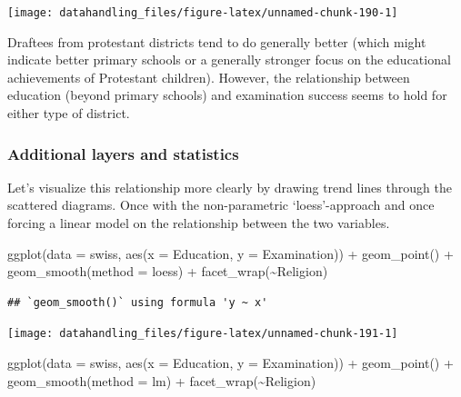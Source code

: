 \documentclass[
  12pt,
]{style/krantz}
\newenvironment{Shaded}{\begin{snugshade}}{\end{snugshade}}
\newcommand{\AttributeTok}[1]{\textcolor[rgb]{0.77,0.63,0.00}{#1}}
\newcommand{\FunctionTok}[1]{\textcolor[rgb]{0.00,0.00,0.00}{#1}}
\newcommand{\NormalTok}[1]{#1}
\newcommand{\SpecialCharTok}[1]{\textcolor[rgb]{0.00,0.00,0.00}{#1}}
\newcommand{\StringTok}[1]{\textcolor[rgb]{0.31,0.60,0.02}{#1}}
\begin{document}
\texttt{[image: datahandling\_files/figure-latex/unnamed-chunk-190-1]}

Draftees from protestant districts tend to do generally better (which might indicate better primary schools or a generally stronger focus on the educational achievements of Protestant children). However, the relationship between education (beyond primary schools) and examination success seems to hold for either type of district.

\hypertarget{additional-layers-and-statistics}{%
\subsubsection{Additional layers and statistics}\label{additional-layers-and-statistics}}

Let's visualize this relationship more clearly by drawing trend lines through the scattered diagrams. Once with the non-parametric `loess'-approach and once forcing a linear model on the relationship between the two variables.

\begin{Shaded}
\begin{Highlighting}[]
\FunctionTok{ggplot}\NormalTok{(}\AttributeTok{data =}\NormalTok{ swiss, }\FunctionTok{aes}\NormalTok{(}\AttributeTok{x =}\NormalTok{ Education, }\AttributeTok{y =}\NormalTok{ Examination)) }\SpecialCharTok{+}
     \FunctionTok{geom\_point}\NormalTok{() }\SpecialCharTok{+}
     \FunctionTok{geom\_smooth}\NormalTok{(}\AttributeTok{method =} \StringTok{\textquotesingle{}loess\textquotesingle{}}\NormalTok{) }\SpecialCharTok{+}
     \FunctionTok{facet\_wrap}\NormalTok{(}\SpecialCharTok{\textasciitilde{}}\NormalTok{Religion)}
\end{Highlighting}
\end{Shaded}

\begin{verbatim}
## `geom_smooth()` using formula 'y ~ x'
\end{verbatim}

\texttt{[image: datahandling\_files/figure-latex/unnamed-chunk-191-1]}

\begin{Shaded}
\begin{Highlighting}[]
\FunctionTok{ggplot}\NormalTok{(}\AttributeTok{data =}\NormalTok{ swiss, }\FunctionTok{aes}\NormalTok{(}\AttributeTok{x =}\NormalTok{ Education, }\AttributeTok{y =}\NormalTok{ Examination)) }\SpecialCharTok{+}
     \FunctionTok{geom\_point}\NormalTok{() }\SpecialCharTok{+}
     \FunctionTok{geom\_smooth}\NormalTok{(}\AttributeTok{method =} \StringTok{\textquotesingle{}lm\textquotesingle{}}\NormalTok{) }\SpecialCharTok{+}
     \FunctionTok{facet\_wrap}\NormalTok{(}\SpecialCharTok{\textasciitilde{}}\NormalTok{Religion)}
\end{Highlighting}
\end{Shaded}
\end{document}
